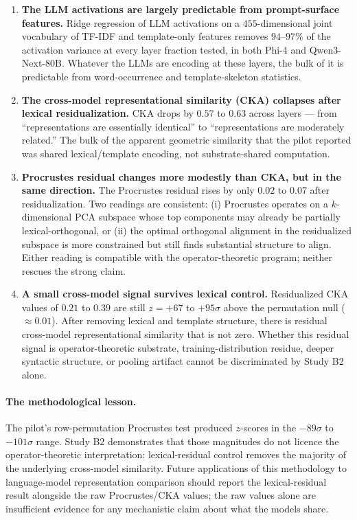 \begin{enumerate}
    \item \textbf{The LLM activations are largely predictable from
        prompt-surface features.} Ridge regression of LLM activations
        on a $455$-dimensional joint vocabulary of TF-IDF and
        template-only features removes $94$--$97\%$ of the
        activation variance at every layer fraction tested, in both
        Phi-4 and Qwen3-Next-80B. Whatever the LLMs are encoding at
        these layers, the bulk of it is predictable from
        word-occurrence and template-skeleton statistics.
    \item \textbf{The cross-model representational similarity (CKA)
        collapses after lexical residualization.} CKA drops by
        $0.57$ to $0.63$ across layers --- from ``representations
        are essentially identical'' to ``representations are
        moderately related.'' The bulk of the apparent geometric
        similarity that the pilot reported was shared lexical/template
        encoding, not substrate-shared computation.
    \item \textbf{Procrustes residual changes more modestly than
        CKA, but in the same direction.} The Procrustes residual
        rises by only $0.02$ to $0.07$ after residualization. Two
        readings are consistent: (i) Procrustes operates on a
        $k$-dimensional PCA subspace whose top components may
        already be partially lexical-orthogonal, or (ii) the optimal
        orthogonal alignment in the residualized subspace is more
        constrained but still finds substantial structure to align.
        Either reading is compatible with the operator-theoretic
        program; neither rescues the strong claim.
    \item \textbf{A small cross-model signal survives lexical control.}
        Residualized CKA values of $0.21$ to $0.39$ are still
        $z = +67$ to $+95\sigma$ above the permutation null
        ($\approx 0.01$). After removing lexical and template
        structure, there is residual cross-model representational
        similarity that is not zero. Whether this residual signal is
        operator-theoretic substrate, training-distribution residue,
        deeper syntactic structure, or pooling artifact cannot be
        discriminated by Study B2 alone.
\end{enumerate}

\paragraph{The methodological lesson.} The pilot's row-permutation
Procrustes test produced $z$-scores in the $-89\sigma$ to $-101\sigma$
range. Study B2 demonstrates that those magnitudes do not licence
the operator-theoretic interpretation: lexical-residual control
removes the majority of the underlying cross-model similarity. Future
applications of this methodology to language-model representation
comparison should report the lexical-residual result alongside the
raw Procrustes/CKA values; the raw values alone are insufficient
evidence for any mechanistic claim about what the models share.
